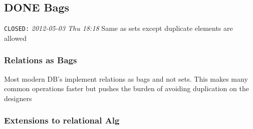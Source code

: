 \documentclass[11pt]{article}
\begin{document}
\subsection{\textbf{DONE} Bags}
\label{sec-4.9}

   \texttt{CLOSED:} \textit{2012-05-03 Thu 18:18}\newline
   Same as sets except duplicate elements are allowed
\subsubsection{Relations as Bags}
\label{sec-4.9.1}

    Most modern DB's implement relations as bags and not sets. This
    makes many common operations faster but pushes the burden of
    avoiding duplication on the designers
\subsubsection{Extensions to relational Alg}
\label{sec-4.9.2}
\end{document}
